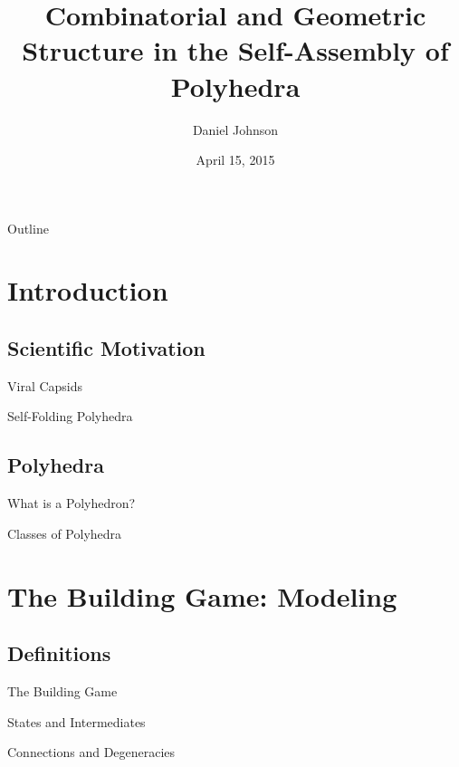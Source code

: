 \documentclass{beamer}
\title{Combinatorial and Geometric Structure in the Self-Assembly of Polyhedra}
\author{Daniel Johnson}
\date{April 15, 2015}
\begin{document}

\frame{\titlepage}

\section[Outline]{}
\begin{frame}{Outline}
  \tableofcontents
\end{frame}

\section{Introduction}
\subsection{Scientific Motivation}
\begin{frame}{Viral Capsids}
\end{frame}
\begin{frame}{Self-Folding Polyhedra}
\end{frame}

\subsection{Polyhedra}
\begin{frame}{What is a Polyhedron?}
\end{frame}
\begin{frame}{Classes of Polyhedra}
\end{frame}


\section{The Building Game: Modeling}
\subsection{Definitions}
\begin{frame}{The Building Game}
\end{frame}

\begin{frame}{States and Intermediates}
\end{frame}

\begin{frame}{Connections and Degeneracies}
\end{frame}
\end{document}
